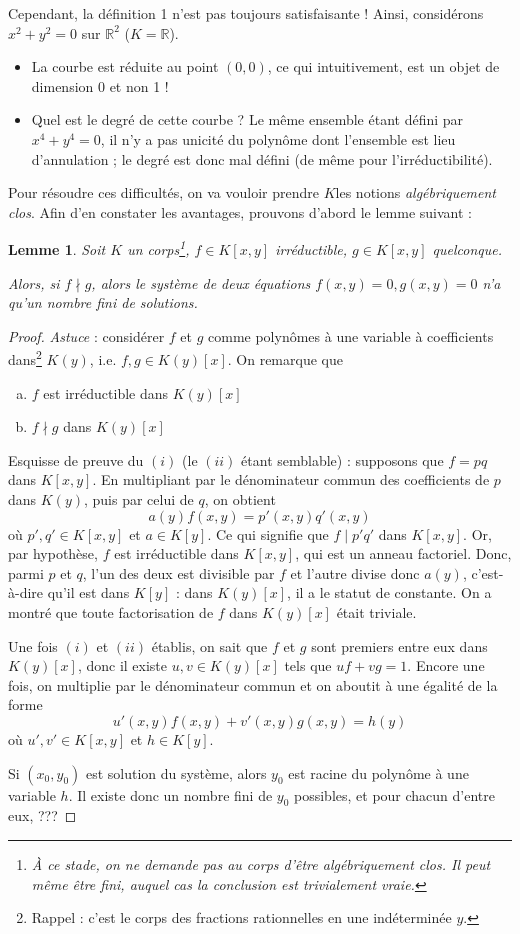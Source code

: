 \documentclass[a4paper, 11pt]{article}
\newtheorem{lemme}[théorème]{Lemme}
\theoremstyle{definition}
\newcommand{\real}{\mathbb{R}}
\begin{document}
Cependant, la définition 1 n'est pas toujours satisfaisante !
Ainsi, considérons $x^2 + y^2 = 0$ sur $\real^2$ ($K = \real$).
\begin{itemize}
\item La courbe est réduite au point $(0,0)$, ce qui intuitivement,
  est un objet de dimension 0 et non 1 !
\item Quel est le degré de cette courbe ? Le même ensemble étant
  défini par $x^4 + y^4 = 0$, il n'y a pas unicité du polynôme dont
  l'ensemble est lieu d'annulation ; le degré est donc mal défini (de
  même pour l'irréductibilité).
\end{itemize}

Pour résoudre ces difficultés, on va vouloir prendre $K$les notions
\emph{algébriquement clos}. Afin d'en constater les avantages,
prouvons d'abord le lemme suivant :
\begin{lemme}
  Soit $K$ un corps\footnote{À ce stade, on ne demande pas au corps
    d'être algébriquement clos. Il peut même être fini, auquel cas la
    conclusion est trivialement vraie.}, $f \in K[x,y]$ irréductible,
  $g \in K[x,y]$ quelconque.

  Alors, si $f \nmid g$, alors le système de deux équations
  $f(x,y) = 0, g(x,y) = 0$ n'a qu'un nombre fini de solutions.
\end{lemme}
\begin{proof}
  \emph{Astuce} : considérer $f$ et $g$ comme polynômes à une variable
  à coefficients dans\footnote{Rappel : c'est le corps des fractions
    rationnelles en une indéterminée $y$.} $K(y)$, i.e.
  $f, g \in K(y)[x]$. On remarque que
  \begin{enumerate}[(a)]
  \item $f$ est irréductible dans $K(y)[x]$
  \item $f \nmid g$ dans $K(y)[x]$
  \end{enumerate}
  Esquisse de preuve du $(i)$ (le $(ii)$ étant semblable) : supposons
  que $f = pq$ dans $K[x,y]$. En multipliant par le dénominateur
  commun des coefficients de $p$ dans $K(y)$, puis par celui de
  $q$, on obtient
  \[ a(y)f(x,y) = p'(x,y)q'(x,y) \]
  où $p', q' \in K[x,y]$ et $a \in K[y]$. Ce qui signifie que
  $f \mid p'q'$ dans $K[x,y]$. Or, par hypothèse, $f$ est irréductible
  dans $K[x,y]$, qui est un anneau factoriel. Donc, parmi $p$ et $q$,
  l'un des deux est divisible par $f$ et l'autre divise donc $a(y)$,
  c'est-à-dire qu'il est dans $K[y]$ : dans $K(y)[x]$, il a le statut
  de constante. On a montré que toute factorisation de $f$ dans
  $K(y)[x]$ était triviale.

  Une fois $(i)$ et $(ii)$ établis, on sait que $f$ et $g$ sont
  premiers entre eux dans $K(y)[x]$, donc il existe $u, v \in K(y)[x]$
  tels que $uf+vg=1$. Encore une fois, on multiplie par le
  dénominateur commun et on aboutit à une égalité de la forme
  \[ u'(x,y)f(x,y) + v'(x,y)g(x,y) = h(y) \]
  où $u', v' \in K[x,y]$ et $h \in K[y]$.

  Si $(x_0, y_0)$ est solution du système, alors $y_0$ est racine du
  polynôme à une variable $h$. Il existe donc un nombre fini de $y_0$
  possibles, et pour chacun d'entre eux, ???
\end{proof}
\end{document}
